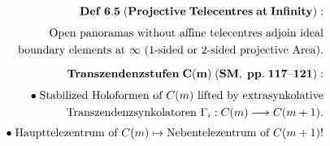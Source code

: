\documentclass[preview]{standalone}
\begin{document}
\begin{align*}
\special{dvisvgm:raw <g id='unique000'>}\mathbf{Def\;6.5\;(Projective\;Telecentres\;at\;Infinity):}\\[4pt]\text{Open panoramas without affine telecentres adjoin ideal}\\\text{boundary elements at }\infty\text{ (1-sided or 2-sided projective Area).}\\[6pt]\mathbf{Transzendenzstufen\;C(m)\;(SM,\;pp.\;117\text{--}121):}\\[4pt]\bullet\;\text{Stabilized Holoformen of }C(m)\text{ lifted by extrasynkolative}\\\;\;\text{Transzendenzsynkolatoren }\Gamma_i: C(m) \longrightarrow C(m+1).\\[3pt]\bullet\;\text{Haupttelezentrum of }C(m)\mapsto\text{Nebentelezentrum of }C(m+1)!\special{dvisvgm:raw </g>}
\end{align*}
\end{document}
